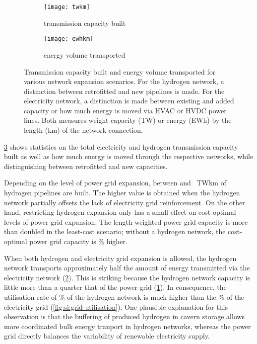 \begin{figure}
    \centering
        \begin{subfigure}[t]{0.49\textwidth}
            \centering
            \caption{transmission capacity built}
            \texttt{[image: twkm]}
            \label{fig:network-stats:twkm}
        \end{subfigure}
        \begin{subfigure}[t]{0.49\textwidth}
            \centering
            \caption{energy volume transported}
            \texttt{[image: ewhkm]}
            \label{fig:network-stats:ewhkm}
        \end{subfigure}
    \caption{Transmission capacity built and energy volume transported for
        various network expansion scenarios. For the hydrogen network, a
        distinction between retrofitted and new pipelines is made. For the
        electricity network, a distinction is made between existing and added
        capacity or how much energy is moved via HVAC or HVDC power lines. Both
        measures weight capacity (TW) or energy (EWh) by the length (km) of the
        network connection.}
    \label{fig:network-stats}
\end{figure}

\cref{fig:network-stats} shows statistics on the total electricity and hydrogen
transmission capacity built as well as how much energy is moved through the
respective networks, while distinguishing between retrofitted and new
capacities.

Depending on the level of power grid expansion, between \mintwkmhydrogen and
\maxtwkmhydrogen~TWkm of hydrogen pipelines are built. The higher value is
obtained when the hydrogen network partially offsets the lack of electricity
grid reinforcement. On the other hand, restricting hydrogen expansion only has a
small effect on cost-optimal levels of power grid expansion. The length-weighted
power grid capacity is more than doubled in the least-cost scenario; without a
hydrogen network, the cost-optimal power grid capacity is \twkmhigher\% higher.

When both hydrogen and electricity grid expansion is allowed, the hydrogen
network transports approximately half the amount of energy transmitted via the
electricity network (\cref{fig:network-stats:ewhkm}). This is striking because
the hydrogen network capacity is little more than a quarter that of the power
grid (\cref{fig:network-stats:twkm}). In consequence, the utilisation rate of
\utilisationHy\% of the hydrogen network is much higher than the
\utilisationAC\% of the electricity grid (\cref{fig:si:grid-utilisation}). One
plausible explanation for this observation is that the buffering of produced
hydrogen in cavern storage allows more coordinated bulk energy tranport in
hydrogen networks, whereas the power grid directly balances the variability of
renewable electricity supply. %

